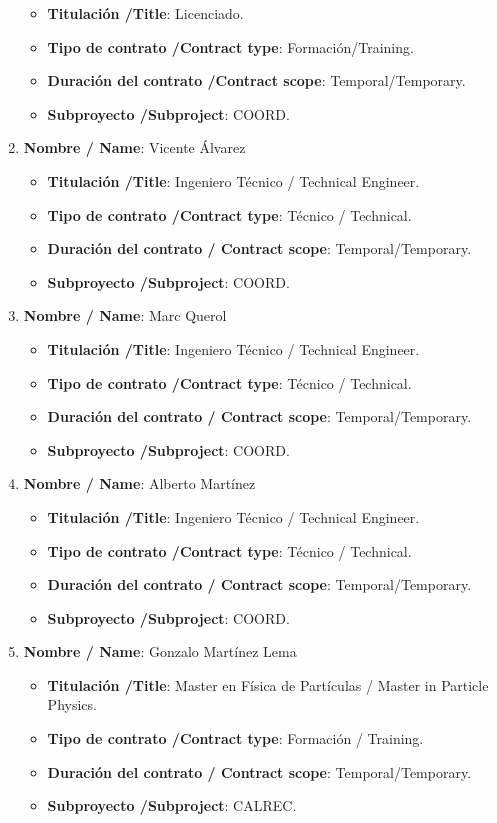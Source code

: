 \begin{enumerate}
\begin{itemize}
\item {\bf Titulación /Title}: Licenciado. 
\item {\bf Tipo de contrato /Contract type}: Formación/Training. 
\item {\bf Duración del contrato /Contract scope}: Temporal/Temporary. 
\item {\bf Subproyecto /Subproject}: COORD. 
\end{itemize}
\item {\bf Nombre / Name}: Vicente Álvarez
\begin{itemize}
\item {\bf Titulación /Title}: Ingeniero Técnico / Technical Engineer.  
\item {\bf Tipo de contrato /Contract type}: Técnico / Technical. 
\item {\bf Duración del contrato / Contract scope}: Temporal/Temporary. 
\item {\bf Subproyecto /Subproject}: COORD. 
\end{itemize}
\item {\bf Nombre / Name}: Marc Querol
\begin{itemize}
\item {\bf Titulación /Title}: Ingeniero Técnico / Technical Engineer.  
\item {\bf Tipo de contrato /Contract type}: Técnico / Technical. 
\item {\bf Duración del contrato / Contract scope}: Temporal/Temporary. 
\item {\bf Subproyecto /Subproject}: COORD. 
\end{itemize}
\item {\bf Nombre / Name}: Alberto Martínez
\begin{itemize}
\item {\bf Titulación /Title}: Ingeniero Técnico / Technical Engineer.  
\item {\bf Tipo de contrato /Contract type}: Técnico / Technical. 
\item {\bf Duración del contrato / Contract scope}: Temporal/Temporary. 
\item {\bf Subproyecto /Subproject}: COORD. 
\end{itemize}
\item {\bf Nombre / Name}: Gonzalo Mart\'inez Lema
\begin{itemize}
\item {\bf Titulación /Title}: Master en F\'isica de Part\'iculas / Master in Particle Physics.  
\item {\bf Tipo de contrato /Contract type}: Formación / Training. 
\item {\bf Duración del contrato / Contract scope}: Temporal/Temporary. 
\item {\bf Subproyecto /Subproject}: CALREC. 
\end{itemize}
\end{enumerate}

